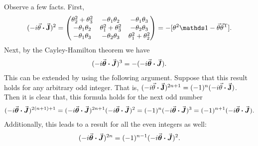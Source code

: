 Observe a few facts.
First,
\begin{eqnarray}
    \label{eq:M-sq}
    (-i \va{\theta} \vdot \va{J})^2 = 
    \begin{pmatrix}
        \theta_2^2 + \theta_3^2 & -\theta_1\theta_2 & -\theta_1\theta_3 \\
        -\theta_1\theta_2 & \theta_1^2 + \theta_3^2 & -\theta_2\theta_3 \\
        -\theta_1\theta_3 & -\theta_2\theta_3 & \theta_1^2 + \theta_2^2
    \end{pmatrix}
    = -[\theta^2\id - \va{\theta}\va{\theta}^{\rm T}]
.\end{eqnarray}
Next, by the Cayley-Hamilton theorem we have
\begin{eqnarray}
    \label{eq:M-characteristic-solve}
    (-i \va*{\theta} \vdot \va*{J})^{3} = -(-i \va*{\theta} \vdot \va*{J})
.\end{eqnarray}
This can be extended by using the following argument.
Suppose that this result holds for any arbitrary odd integer.
That is, $(-i \va{\theta} \vdot \va{J})^{2n+1} = (-1)^{n}(-i \va{\theta} \vdot \va{J})$.
Then it is clear that, this formula holds for the next odd number
\begin{eqnarray}
    \label{eq:general-odd}
    (-i \va*{\theta} \vdot \va*{J})^{2(n+1)+1} = (-i \va*{\theta} \vdot \va*{J})^{2n+1}(-i \va*{\theta} \vdot \va*{J})^2 = (-1)^{n} (-i \va*{\theta} \vdot \va*{J})^{3} = (-1)^{n+1}(-i \va*{\theta} \vdot \va*{J})
.\end{eqnarray}
Additionally, this leads to a result for all the even integers as well:
\begin{eqnarray}
    \label{eq:general-even}
    (-i \va*{\theta} \vdot \va*{J})^{2n} = (-1)^{n-1}(-i \va*{\theta} \vdot \va*{J})^2
.\end{eqnarray}

